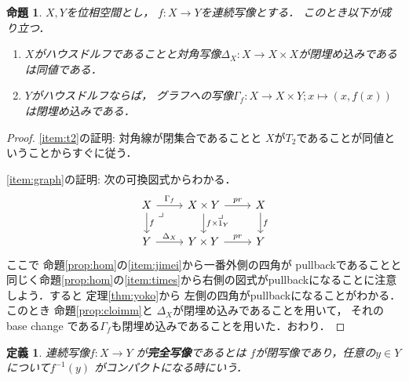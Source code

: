 \documentclass[leqno, a4paper, 12pt, dvipdfmx]{jsarticle}
\newtheorem{prop}[thm]{命題}
\newtheorem{df}[thm]{定義}
\begin{document}
\begin{prop}\label{prop:immgraph}
$X, Y$を位相空間とし，
$f\colon X\to Y$を連続写像とする．
このとき以下が成り立つ．
\begin{enumerate}[label=\textup{(T\arabic*)}]
\item\label{item:t2}
$X$がハウスドルフであることと対角写像$\Delta_{X}\colon X\to X\times X$が閉埋め込みであるは同値である．

\item\label{item:graph}
$Y$がハウスドルフならば，
グラフへの写像$\Gamma_{f}\colon X\to X\times Y; x\mapsto (x, f(x))$は閉埋め込みである．
\end{enumerate}
\end{prop}
\begin{proof}
\ref{item:t2}の証明: 対角線が閉集合であることと
$X$が$T_{2}$であることが同値ということからすぐに従う．

\ref{item:graph}の証明: 
次の可換図式からわかる．
\[
\begin{tikzcd}
X \arrow[r, "\Gamma_{f}"] \arrow[d, "f"] \arrow[dr, phantom, "\lrcorner", very near start]
& X\times Y \arrow[d,"f\times 1_{Y}"]  \arrow[r, "pr"]\arrow[dr, phantom, "\lrcorner", very near start] & X \arrow[d, "f"]\\
Y \arrow[r,"\Delta_{X}"] & Y\times Y \arrow[r, "pr"]& Y
\end{tikzcd}
\]
ここで
命題\ref{prop:hom}の\ref{item:jimei}から一番外側の四角が
pullbackであることと
同じく命題\ref{prop:hom}の\ref{item:times}から右側の図式がpullbackになることに注意しよう．すると
定理\ref{thm:yoko}から
左側の四角がpullbackになることがわかる．
このとき
命題\ref{prop:cloimm}と
$\Delta_{X}$が閉埋め込みであることを用いて，
それの
base change である$\Gamma_{f}$も閉埋め込みであることを用いた．おわり．
\end{proof}


\begin{df}
連続写像$f\colon X\to Y$
が\textbf{完全写像}であるとは
$f$が閉写像であり，任意の$y\in Y$
について$f^{-1}(y)$
がコンパクトになる時にいう．
\end{df}
\end{document}
